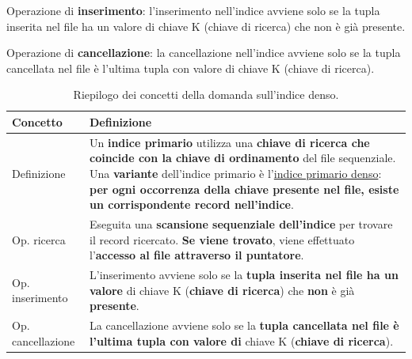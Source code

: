 \documentclass[a4paper]{article}
\begin{document}
\begin{enumerate}
		\noindent
		Operazione di \textbf{inserimento}: l'inserimento nell'indice avviene solo se la tupla inserita nel file ha un valore di chiave K (chiave di ricerca) che non è già presente.
		
		Operazione di \textbf{cancellazione}: la cancellazione nell'indice avviene solo se la tupla cancellata nel file è l'ultima tupla con valore di chiave K (chiave di ricerca).\newpage
		
		\begin{table}[!htp]
			\centering
			\begin{tabular}{@{} l p{25em} @{}}
				\toprule
				Concetto & Definizione \\
				\midrule
				Definizione 		& Un \textbf{indice primario} utilizza una \textbf{chiave di ricerca che coincide con la chiave di ordinamento} del file sequenziale. Una \textbf{variante} dell'indice primario è l'\underline{indice primario denso}: \textbf{per ogni occorrenza della chiave presente nel file, esiste un corrispondente record nell'indice}. \\ [.7em]
				Op. ricerca 		& Eseguita una \textbf{scansione sequenziale dell'indice} per trovare il record ricercato. \textbf{Se viene trovato}, viene effettuato l'\textbf{accesso al file attraverso il puntatore}. \\ [.7em]
				Op. inserimento		& L'inserimento avviene solo se la \textbf{tupla inserita nel file ha un valore} di chiave K (\textbf{chiave di ricerca}) che \textbf{non} è già \textbf{presente}. \\ [.7em]
				Op. cancellazione	& La cancellazione avviene solo se la \textbf{tupla cancellata nel file è l'ultima tupla con valore di} chiave K (\textbf{chiave di ricerca}). \\
				\bottomrule
			\end{tabular}
			\caption{Riepilogo dei concetti della domanda sull'indice denso.}
		\end{table}
	\end{enumerate}\newpage
	
\end{document}
